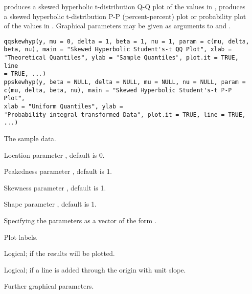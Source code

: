\begin{Description}\relax
{} produces a skewed hyperbolic t-distribution Q-Q plot
of the values in ,  produces a skewed
hyperbolic t-distribution P-P (percent-percent) plot or probability
plot of the values in .
Graphical parameters may be given as arguments to  and
.
\end{Description}
\begin{Usage}
\begin{verbatim}
qqskewhyp(y, mu = 0, delta = 1, beta = 1, nu = 1, param = c(mu, delta,
beta, nu), main = "Skewed Hyperbolic Student's-t QQ Plot", xlab =
"Theoretical Quantiles", ylab = "Sample Quantiles", plot.it = TRUE, line
= TRUE, ...)
ppskewhyp(y, beta = NULL, delta = NULL, mu = NULL, nu = NULL, param =
c(mu, delta, beta, nu), main = "Skewed Hyperbolic Student's-t P-P Plot",
xlab = "Uniform Quantiles", ylab =
"Probability-integral-transformed Data", plot.it = TRUE, line = TRUE, ...)

\end{verbatim}
\end{Usage}
\begin{Arguments}
\begin{ldescription}
\item[\code{y}] The sample data.
\item[\code{mu}] Location parameter , default is 0.
\item[\code{delta}] Peakedness parameter , default is 1.
\item[\code{beta}] Skewness parameter , default is 1.
\item[\code{nu}] Shape parameter , default is 1.
\item[\code{param}] Specifying the parameters as a vector of the form
.
\item[\code{main,xlab,ylab}] Plot labels.
\item[\code{plot.it}] Logical; if  the results will be plotted.
\item[\code{line}] Logical; if  a line is added through the
origin with unit slope.
\item[\code{...}] Further graphical parameters.
\end{ldescription}
\end{Arguments}
